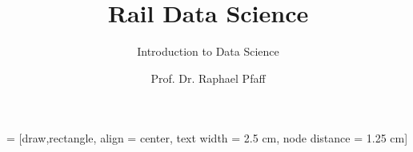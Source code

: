 \documentclass[slidestop,compress,mathserif, aspectratio = 169]{beamer}
\begin{document}
 = [draw,rectangle, align = center, text width = 2.5 cm, node distance = 1.25 cm]

\newcommand{\Var}{\operatorname{Var}}
\newcommand{\mum}{\operatorname{\mu m}}
\newcommand{\E}{\operatorname{E}}
\newcommand{
\offslide}[2]{
\begin{frame}
\frametitle{\includegraphics[scale=0.05] {Offwhite} \hspace{.5mm} #1}
\begin{tikzpicture}[x=1cm, y=1cm, semitransparent]
\draw[step=5mm, line width=0.2mm, black!40!white] (0,0) grid (\textwidth,\textheight-1cm);
\node[anchor = south east] at (\textwidth,0) {#2};

\end{tikzpicture}
\end{frame}
}
\newcommand{\source}[1]{\rotatebox{90}{\tiny \color{gray} #1}}

\newcommand{\lehrtext}[1]{
\only<article>{
\vspace{0.3cm}
\leavevmode%
  \tabto*{-1.8cm}%
  \smash{\belowbaseline[-\ht\strutbox]{\makebox[0pt]%
    [l]%
  {\texttt{[image: teacher]}}}}%
  \tabto*{\TabPrevPos}%
#1
}
}

\title{Rail Data Science}
\subtitle{Introduction to Data Science}
\author{Prof. Dr. Raphael Pfaff}

\begin{frame} %
\titlepage
\end{frame}


%
%
%
%
%
%
%
%
%
\end{document}
